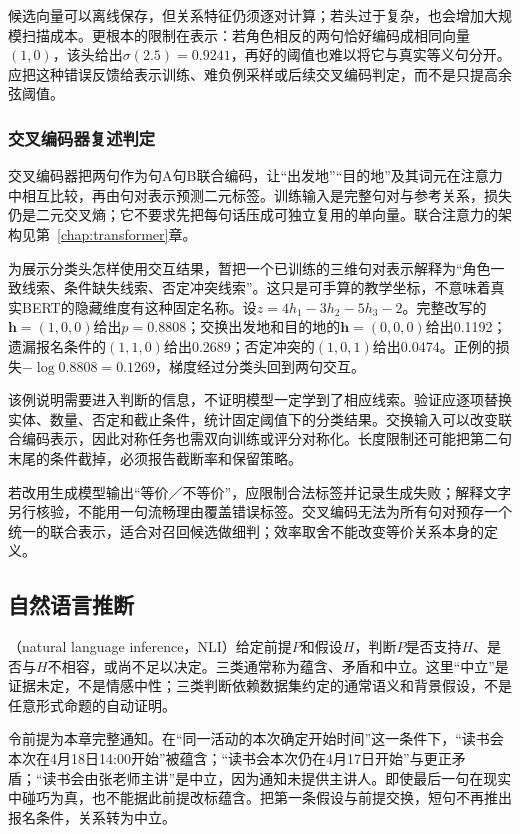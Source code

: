 候选向量可以离线保存，但关系特征仍须逐对计算；若头过于复杂，也会增加大规模扫描成本。更根本的限制在表示：若角色相反的两句恰好编码成相同向量$(1,0)$，该头给出$\sigma(2.5)=0.9241$，再好的阈值也难以将它与真实等义句分开。应把这种错误反馈给表示训练、难负例采样或后续交叉编码判定，而不是只提高余弦阈值。

\subsubsection{交叉编码器复述判定}
\label{sec:nlp-classification-paraphrase-cross}

交叉编码器把两句作为\code{[CLS]}句A\code{[SEP]}句B\code{[SEP]}联合编码，让“出发地”“目的地”及其词元在注意力中相互比较，再由句对表示预测二元标签。训练输入是完整句对与参考关系，损失仍是二元交叉熵；它不要求先把每句话压成可独立复用的单向量。联合注意力的架构见第~\ref{chap:transformer}章。

为展示分类头怎样使用交互结果，暂把一个已训练的三维句对表示解释为“角色一致线索、条件缺失线索、否定冲突线索”。这只是可手算的教学坐标，不意味着真实BERT的隐藏维度有这种固定名称。设$z=4h_1-3h_2-5h_3-2$。完整改写的$\bm h=(1,0,0)$给出$p=0.8808$；交换出发地和目的地的$\bm h=(0,0,0)$给出0.1192；遗漏报名条件的$(1,1,0)$给出0.2689；否定冲突的$(1,0,1)$给出0.0474。正例的损失$-\log0.8808=0.1269$，梯度经过分类头回到两句交互。

该例说明需要进入判断的信息，不证明模型一定学到了相应线索。验证应逐项替换实体、数量、否定和截止条件，统计固定阈值下的分类结果。交换输入可以改变联合编码表示，因此对称任务也需双向训练或评分对称化。长度限制还可能把第二句末尾的条件截掉，必须报告截断率和保留策略。

若改用生成模型输出“等价／不等价”，应限制合法标签并记录生成失败；解释文字另行核验，不能用一句流畅理由覆盖错误标签。交叉编码无法为所有句对预存一个统一的联合表示，适合对召回候选做细判；效率取舍不能改变等价关系本身的定义。

\subsection{自然语言推断}
\label{sec:nlp-classification-nli}

（natural language inference，NLI）给定前提$P$和假设$H$，判断$P$是否支持$H$、是否与$H$不相容，或尚不足以决定。三类通常称为蕴含、矛盾和中立。这里“中立”是证据未定，不是情感中性；三类判断依赖数据集约定的通常语义和背景假设，不是任意形式命题的自动证明。

令前提为本章完整通知。在“同一活动的本次确定开始时间”这一条件下，“读书会本次在4月18日14:00开始”被蕴含；“读书会本次仍在4月17日开始”与更正矛盾；“读书会由张老师主讲”是中立，因为通知未提供主讲人。即使最后一句在现实中碰巧为真，也不能据此前提改标蕴含。把第一条假设与前提交换，短句不再推出报名条件，关系转为中立。

